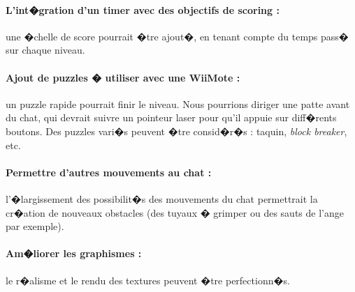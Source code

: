 \documentclass[a4paper,11pt]{article}
\begin{document}
\paragraph{L'int�gration d'un timer avec des objectifs de scoring :} une �chelle de score pourrait �tre ajout�, en tenant compte du temps pass� sur chaque niveau.
\paragraph{Ajout de puzzles � utiliser avec une WiiMote :} un puzzle rapide pourrait finir le niveau. Nous pourrions diriger une patte avant du chat, qui devrait suivre un pointeur laser pour qu'il appuie sur diff�rents boutons. Des puzzles vari�s peuvent �tre consid�r�s : taquin, \textit{block breaker}, etc.
\paragraph{Permettre d'autres mouvements au chat :} l'�largissement des possibilit�s des mouvements du chat permettrait la cr�ation de nouveaux obstacles (des tuyaux � grimper ou des sauts de l'ange par exemple).
\paragraph{Am�liorer les graphismes :} le r�alisme et le rendu des textures peuvent �tre perfectionn�s.
\\
\end{document}
